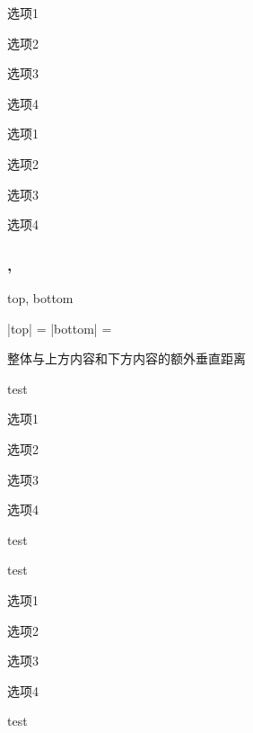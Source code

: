 \documentclass{xdyy-usermanual}
\begin{document}
\begin{vexample}
    \begin{xchoices}[items = 2, label-pos = top]
      \item 选项1
      \item 选项2
      \item 选项3
      \item 选项4
    \end{xchoices}
\end{vexample}

\begin{vexample}
    \begin{xchoices}[items = 2, label-pos = top, h-offset = 2em]
      \item 选项1
      \item 选项2
      \item 选项3
      \item 选项4
    \end{xchoices}
\end{vexample}



\subsubsection{ ,  }


\begin{function}{top, bottom}
  \begin{syntax}
    |top| =   \init{0pt}
    |bottom| =   \init{0pt}
  \end{syntax}
  整体与上方内容和下方内容的额外垂直距离
\end{function}
\begin{vexample}
    test
    \begin{xchoices}
      \item 选项1
      \item 选项2
      \item 选项3
      \item 选项4
    \end{xchoices}
    test
\end{vexample}
\begin{vexample}
    test
    \begin{xchoices}[top = -1em, bottom = 1em]
      \item 选项1
      \item 选项2
      \item 选项3
      \item 选项4
    \end{xchoices}
    test
\end{vexample}
\end{document}
